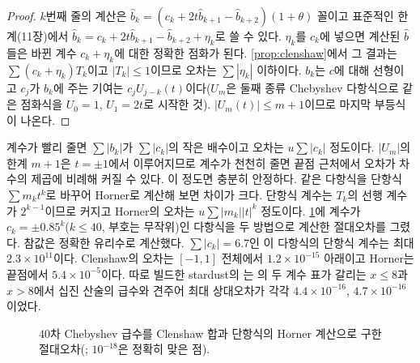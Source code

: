 \begin{proof}
$k$번째 줄의 계산은 $\hat b_k=(c_k+2t\hat b_{k+1}-\hat b_{k+2})(1+\theta)$ 꼴이고 표준적인 한계(11장)에서 $\hat b_k=c_k+2t\hat b_{k+1}-\hat b_{k+2}+\eta_k$로 쓸 수 있다. $\eta_k$를 $c_k$에 넣으면 계산된 $\hat b$들은 바뀐 계수 $c_k+\eta_k$에 대한 정확한 점화가 된다. \cref{prop:clenshaw}에서 그 결과는 $\sum(c_k+\eta_k)T_k$이고 $|T_k|\le1$이므로 오차는 $\sum|\eta_k|$ 이하이다. $b_k$는 $c$에 대해 선형이고 $c_j$가 $b_k$에 주는 기여는 $c_jU_{j-k}(t)$이다($U_m$은 둘째 종류 Chebyshev 다항식으로 같은 점화식을 $U_0=1$, $U_1=2t$로 시작한 것). $|U_m(t)|\le m+1$이므로 마지막 부등식이 나온다.
\end{proof}

계수가 빨리 줄면 $\sum|b_k|$가 $\sum|c_k|$의 작은 배수이고 오차는 $u\sum|c_k|$ 정도이다. $|U_m|$의 한계 $m+1$은 $t=\pm1$에서 이루어지므로 계수가 천천히 줄면 끝점 근처에서 오차가 차수의 제곱에 비례해 커질 수 있다. 이 정도면 충분히 안정하다. 같은 다항식을 단항식 $\sum m_kt^k$로 바꾸어 Horner로 계산해 보면 차이가 크다. 단항식 계수는 $T_k$의 선행 계수가 $2^{k-1}$이므로 커지고 Horner의 오차는 $u\sum|m_k||t|^k$ 정도이다. \cref{fig:clenshaw}에 계수가 $c_k=\pm0.85^k$($k\le40$, 부호는 무작위)인 다항식을 두 방법으로 계산한 절대오차를 그렸다. 참값은 정확한 유리수로 계산했다. $\sum|c_k|=6.7$인 이 다항식의 단항식 계수는 최대 $2.3\times10^{11}$이다. Clenshaw의 오차는 $[-1,1]$ 전체에서 $1.2\times10^{-15}$ 아래이고 Horner는 끝점에서 $5.4\times10^{-5}$이다. 따로 빌드한 stardust의 는 의 두 계수 표가 갈리는 $x\le8$과 $x>8$에서 십진 산술의 급수와 견주어 최대 상대오차가 각각 $4.4\times10^{-16}$, $4.7\times10^{-16}$이었다.

\begin{figure}[htbp]
\centering
{}
\caption{$40$차 Chebyshev 급수를 Clenshaw 합과 단항식의 Horner 계산으로 구한 절대오차(; $10^{-18}$은 정확히 맞은 점).}
\label{fig:clenshaw}
\end{figure}


